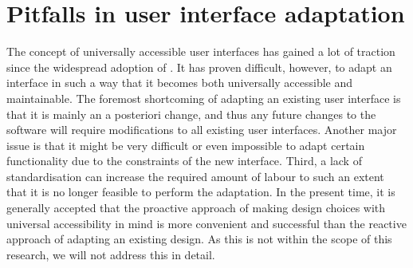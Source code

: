 \section{Pitfalls in user interface adaptation}
\label{section:pitfallsinuserinterfaceadaptation}
The concept of universally accessible user interfaces has gained a lot of traction since the widespread adoption of . It has proven difficult, however, to adapt an interface in such a way that it becomes both universally accessible and maintainable. The foremost shortcoming of adapting an existing user interface is that it is mainly an a posteriori change, and thus any future changes to the software will require modifications to all existing user interfaces. Another major issue is that it might be very difficult or even impossible to adapt certain functionality due to the constraints of the new interface\cite{emiliani2000adaptations}. Third, a lack of standardisation can increase the required amount of labour to such an extent that it is no longer feasible to perform the adaptation\cite{moore1993issues}. In the present time, it is generally accepted that the proactive approach of making design choices with universal accessibility in mind is more convenient and successful than the reactive approach of adapting an existing design\cite{savidis2004unified}. As this is not within the scope of this research, we will not address this in detail.